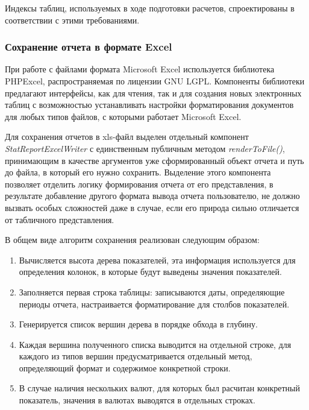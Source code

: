 Индексы таблиц, используемых в ходе подготовки расчетов, спроектированы в соответствии
с этими требованиями.

\subsubsection{Сохранение отчета в формате Excel}
При работе с файлами формата Microsoft Excel используется библиотека PHPExcel\cite{phpexcel},
распространяемая по лицензии GNU LGPL. Компоненты библиотеки предлагают интерфейсы, как
для чтения, так и для создания новых электронных таблиц с возможностью устанавливать
настройки форматирования документов для любых типов файлов, с которыми работает Microsoft Excel.

Для сохранения отчетов в xls-файл выделен отдельный компонент \textit{StatReportExcelWriter}
с единственным публичным методом \textit{renderToFile()}, принимающим в качестве аргументов уже
сформированный объект отчета и путь до файла, в который его нужно сохранить.
Выделение этого компонента позволяет отделить логику формирования отчета от его представления, 
в результате добавление другого формата вывода отчета пользователю, не должно вызвать особых 
сложностей даже в случае, если его природа сильно отличается от табличного представления.

В общем виде алгоритм сохранения реализован следующим образом:
\begin{enumerate}
\item{
  Вычисляется высота дерева показателей, эта информация используется для определения колонок, в которые будут выведены
значения показателей.
}
\item{
  Заполняется первая строка таблицы: записываются даты, определяющие периоды отчета, настраивается форматирование
для столбов показателей.
}
\item{
  Генерируется список вершин дерева в порядке обхода в глубину.
}
\item{
  Каждая вершина полученного списка выводится на отдельной строке, для каждого из типов вершин
предусматривается отдельный метод, определяющий формат и содержимое конкретной строки.
}
\item{
  В случае наличия нескольких валют, для которых был расчитан конкретный показатель, значения в валютах выводятся в 
  отдельных строках.
}
\end{enumerate}


